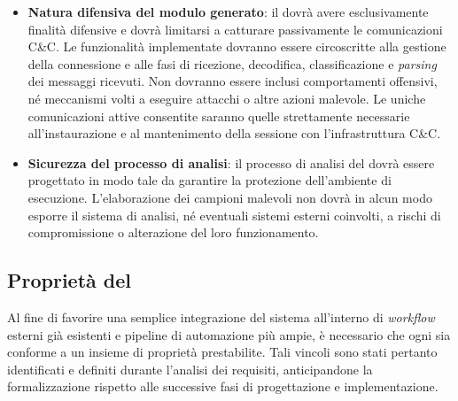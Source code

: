 \begin{description}
\begin{itemize}
    \end{itemize}

    \item[Requisiti di sicurezza:] \hspace{1em}
    
    \begin{itemize}
        \item \textbf{Natura difensiva del modulo generato}: il \capture{} dovrà avere esclusivamente finalità difensive e dovrà limitarsi a catturare passivamente le comunicazioni C\&C. Le funzionalità implementate dovranno essere circoscritte alla gestione della connessione e alle fasi di ricezione, decodifica, classificazione e \emph{parsing} dei messaggi ricevuti. Non dovranno essere inclusi comportamenti offensivi, né meccanismi volti a eseguire attacchi o altre azioni malevole. Le uniche comunicazioni attive consentite saranno quelle strettamente necessarie all'instaurazione e al mantenimento della sessione con l'infrastruttura C\&C.
        
        \item \textbf{Sicurezza del processo di analisi}: il processo di analisi del \binary{} dovrà essere progettato in modo tale da garantire la protezione dell'ambiente di esecuzione. L'elaborazione dei campioni malevoli non dovrà in alcun modo esporre il sistema di analisi, né eventuali sistemi esterni coinvolti, a rischi di compromissione o alterazione del loro funzionamento.
    \end{itemize}

\end{description}


\subsection{Proprietà del \capture{}} %

Al fine di favorire una semplice integrazione del sistema all'interno di \emph{workflow} esterni già esistenti e pipeline di automazione più ampie, è necessario che ogni \capture{} sia conforme a un insieme di proprietà prestabilite. Tali vincoli sono stati pertanto identificati e definiti durante l'analisi dei requisiti, anticipandone la formalizzazione rispetto alle successive fasi di progettazione e implementazione.

